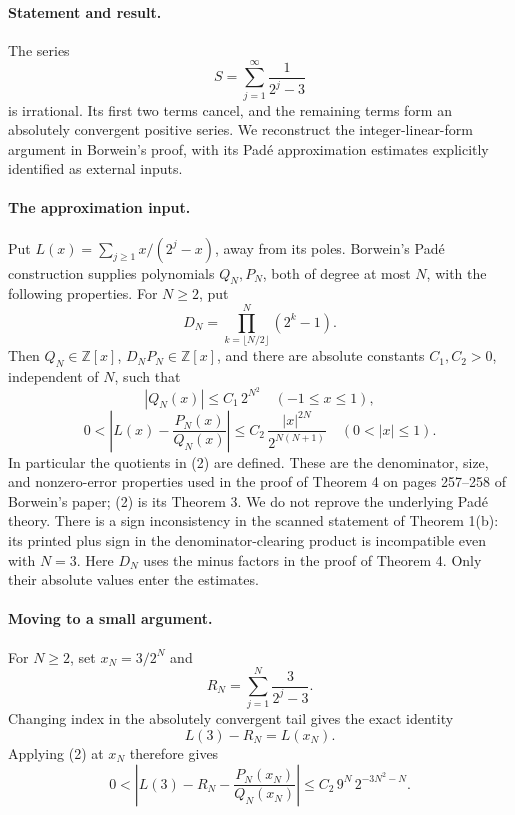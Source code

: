 \paragraph{Statement and result.}
The series
\[
 S=\sum_{j=1}^{\infty}\frac1{2^j-3}
\]
is irrational. Its first two terms cancel, and the remaining terms form an absolutely convergent positive series. We reconstruct the integer-linear-form argument in Borwein's proof, with its Pad\'e approximation estimates explicitly identified as external inputs.

\paragraph{The approximation input.}
Put \(L(x)=\sum_{j\geq1}x/(2^j-x)\), away from its poles. Borwein's Pad\'e construction supplies polynomials \(Q_N,P_N\), both of degree at most \(N\), with the following properties. For \(N\geq2\), put
\[
 D_N=\prod_{k=\lfloor N/2\rfloor}^{N}(2^k-1).
\]
Then \(Q_N\in\mathbb Z[x]\), \(D_NP_N\in\mathbb Z[x]\), and there are absolute constants \(C_1,C_2>0\), independent of \(N\), such that
\[
 |Q_N(x)|\leq C_1\,2^{N^2}\quad(-1\leq x\leq1),
 \tag{1}
\]
\[
 0<\left|L(x)-\frac{P_N(x)}{Q_N(x)}\right|
 \leq C_2\,\frac{|x|^{2N}}{2^{N(N+1)}}
 \quad(0<|x|\leq1).
 \tag{2}
\]
In particular the quotients in (2) are defined. These are the denominator, size, and nonzero-error properties used in the proof of Theorem 4 on pages 257--258 of Borwein's paper; (2) is its Theorem 3. We do not reprove the underlying Pad\'e theory.
There is a sign inconsistency in the scanned statement of Theorem 1(b): its printed plus sign in the denominator-clearing product is incompatible even with \(N=3\). Here \(D_N\) uses the minus factors in the proof of Theorem 4. Only their absolute values enter the estimates.

\paragraph{Moving to a small argument.}
For \(N\geq2\), set \(x_N=3/2^N\) and
\[
 R_N=\sum_{j=1}^{N}\frac3{2^j-3}.
\]
Changing index in the absolutely convergent tail gives the exact identity
\[
 L(3)-R_N=L(x_N).
 \tag{3}
\]
Applying (2) at \(x_N\) therefore gives
\[
 0<
 \left|L(3)-R_N-\frac{P_N(x_N)}{Q_N(x_N)}\right|
 \leq C_2\,9^N\,2^{-3N^2-N}.
 \tag{4}
\]

